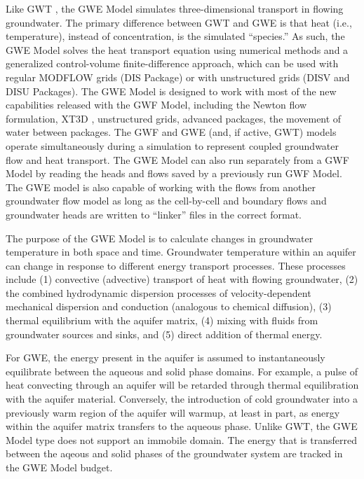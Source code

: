 Like GWT \citep{modflow6gwt}, the GWE Model simulates three-dimensional transport in flowing groundwater.  The primary difference between GWT and GWE is that heat (i.e., temperature), instead of concentration, is the simulated ``species.'' As such, the GWE Model solves the heat transport equation using numerical methods and a generalized control-volume finite-difference approach, which can be used with regular MODFLOW grids (DIS Package) or with unstructured grids (DISV and DISU Packages).  The GWE Model is designed to work with most of the new capabilities released with the GWF Model, including the Newton flow formulation, XT3D \citep{modflow6xt3d}, unstructured grids, advanced packages, the movement of water between packages.  The GWF and GWE (and, if active, GWT) models operate simultaneously during a \mf simulation to represent coupled groundwater flow and heat transport.  The GWE Model can also run separately from a GWF Model by reading the heads and flows saved by a previously run GWF Model.  The GWE model is also capable of working with the flows from another groundwater flow model as long as the cell-by-cell and boundary flows and groundwater heads are written to ``linker'' files in the correct format.  

The purpose of the GWE Model is to calculate changes in groundwater temperature in both space and time.  Groundwater temperature within an aquifer can change in response to different energy transport processes.  These processes include (1) convective (advective) transport of heat with flowing groundwater, (2) the combined hydrodynamic dispersion processes of velocity-dependent mechanical dispersion and conduction (analogous to chemical diffusion), (3) thermal equilibrium with the aquifer matrix, (4) mixing with fluids from groundwater sources and sinks, and (5) direct addition of thermal energy.

For GWE, the energy present in the aquifer is assumed to instantaneously equilibrate between the aqueous and solid phase domains.  For example, a pulse of heat convecting through an aquifer will be retarded through thermal equilibration with the aquifer material.  Conversely, the introduction of cold groundwater into a previously warm region of the aquifer will warmup, at least in part, as energy within the aquifer matrix transfers to the aqueous phase.  Unlike GWT, the GWE Model type does not support an immobile domain.  The energy that is transferred between the aqeous and solid phases of the groundwater system are tracked in the GWE Model budget.

